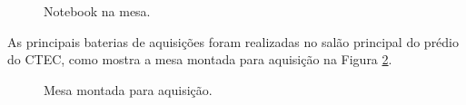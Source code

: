 \documentclass[a4paper,oneside,12pt]{article}
\begin{document}
\begin{figure}
\centering
{}
\caption{Notebook na mesa.}\label{fig:mesa_notebook}
\end{figure}

As principais baterias de aquisições foram realizadas no salão principal do prédio do CTEC, como mostra a mesa montada para aquisição na Figura \ref{fig:mesa_pronta}.

\begin{figure}
\centering
{}
\caption{Mesa montada para aquisição.}\label{fig:mesa_pronta}
\end{figure}
\end{document}
